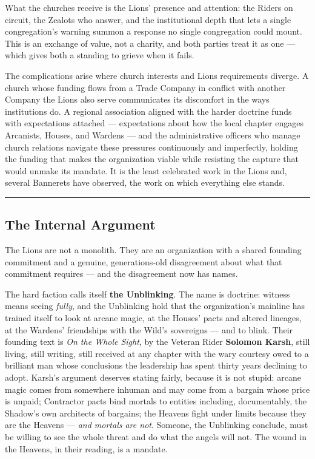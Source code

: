 What the churches receive is the Lions' presence and attention: the Riders on circuit, the Zealots who answer, and the institutional depth that lets a single congregation's warning summon a response no single congregation could mount. This is an exchange of value, not a charity, and both parties treat it as one --- which gives both a standing to grieve when it fails.

The complications arise where church interests and Lions requirements diverge. A church whose funding flows from a Trade Company in conflict with another Company the Lions also serve communicates its discomfort in the ways institutions do. A regional association aligned with the harder doctrine funds with expectations attached --- expectations about how the local chapter engages Arcanists, Houses, and Wardens --- and the administrative officers who manage church relations navigate these pressures continuously and imperfectly, holding the funding that makes the organization viable while resisting the capture that would unmake its mandate. It is the least celebrated work in the Lions and, several Bannerets have observed, the work on which everything else stands.

\medskip\hrule\medskip

\subsection{The Internal Argument}

The Lions are not a monolith. They are an organization with a shared founding commitment and a genuine, generations-old disagreement about what that commitment requires --- and the disagreement now has names.

The hard faction calls itself \textbf{the Unblinking}. The name is doctrine: witness means seeing \textit{fully}, and the Unblinking hold that the organization's mainline has trained itself to look at arcane magic, at the Houses' pacts and altered lineages, at the Wardens' friendships with the Wild's sovereigns --- and to blink. Their founding text is \textit{On the Whole Sight}, by the Veteran Rider \textbf{Solomon Karsh}, still living, still writing, still received at any chapter with the wary courtesy owed to a brilliant man whose conclusions the leadership has spent thirty years declining to adopt. Karsh's argument deserves stating fairly, because it is not stupid: arcane magic comes from somewhere inhuman and may come from a bargain whose price is unpaid; Contractor pacts bind mortals to entities including, documentably, the Shadow's own architects of bargains; the Heavens fight under limits because they are the Heavens --- \textit{and mortals are not}. Someone, the Unblinking conclude, must be willing to see the whole threat and do what the angels will not. The wound in the Heavens, in their reading, is a mandate.

